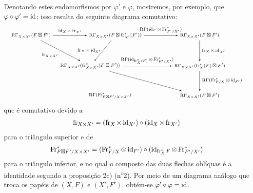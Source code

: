 Denotando estes endomorfismos por $\varphi'$ e $\varphi$, mostremos, por exemplo, que $\varphi\circ\varphi'=\operatorname{id}$; isso resulta do seguinte diagrama comutativo:
\[
\resizebox{\textwidth}{!}{%
\begin{tikzpicture}[baseline=(current bounding box.center),>=stealth,font=\scriptsize]
\node (A) at (0,3.6) {$\RGamma_{X\times X'}(F\boxt F')$};
\node (B) at (4.7,3.6) {$\RGamma_{X\times X'}(F\boxt\fr_{X'}^*(F'))$};
\node (C) at (9.4,3.6) {$\RGamma_{X\times X'}(F\boxt F')$};
\node (D) at (3.3,1.9) {$\RGamma_{X\times X'}(\fr^*_{X\times X'}(F\boxt F'))$};
\node (E) at (9.4,1.9) {$\RGamma_{X\times X'}(\fr_X^*(F)\boxt F')$};
\node (F) at (4.4,0.25) {$\RGamma(\Fr^*_{F\boxt F'/X\times X'})$};
\node (G) at (9.4,0.25) {$\RGamma_{X\times X'}(F\boxt F')$};
\draw[->] (A) -- node[above] {$\id_X\times\fr_{X'}$} (B);
\draw[->] (B) -- node[above] {$\RGamma(\id_F\otimes\Fr^*_{F'/X'})$} (C);
\draw[->] (A) -- node[below left] {$\fr_{X\times X'}$} (D);
\draw[->] (B) -- node[left] {$\fr_X\times\id_{X'}$} (D);
\draw[->] (C) -- node[right] {$\fr_X\times\id_{X'}$} (E);
\draw[->] (D) -- node[above] {$\RGamma(\id_{\fr_X^*(F)}\otimes\Fr^*_{F'/X'})$} (E);
\draw[->] (E) -- node[right] {$\RGamma(\Fr^*_{F/X}\otimes\id_{F'})$} (G);
\draw[->] (D) -- (G);
\end{tikzpicture}%
}
\]
que é comutativo devido a
\[
\operatorname{fr}_{X\times X'}=(\operatorname{fr}_X\times\operatorname{id}_{X'})\circ(\operatorname{id}_X\times\operatorname{fr}_{X'})
\]
para o triângulo superior e de
\[
\operatorname{Fr}^*_{F\boxtimes F'/X\times X'}=(\operatorname{Fr}^*_{F/X}\otimes\operatorname{id}_{F'})\circ(\operatorname{id}_{\operatorname{fr}_X^*F}\otimes\operatorname{Fr}^*_{F'/X'})
\]
para o triângulo inferior, e no qual o composto das duas flechas oblíquas é a identidade segundo a proposição 2c) (n\textsuperscript{o}2). Por meio de um diagrama análogo que troca os papéis de $(X,F)$ e $(X',F')$, obtém-se $\varphi'\circ\varphi=\operatorname{id}$.
